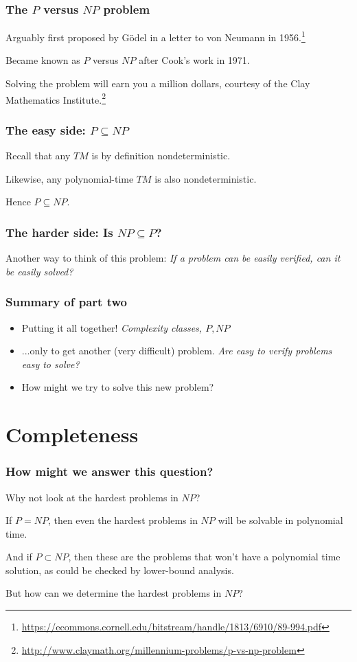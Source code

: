 \documentclass[aspectratio=169]{beamer}
\begin{document}
\begin{frame}
\frametitle{The $P$ versus $NP$ problem}
Arguably first proposed by G\"{o}del in a letter to von Neumann in 1956.\footnote{\url{https://ecommons.cornell.edu/bitstream/handle/1813/6910/89-994.pdf}}

Became known as $P$ versus $NP$ after Cook's work in 1971.

Solving the problem will earn you a million dollars, courtesy of the Clay Mathematics Institute.\footnote{\url{http://www.claymath.org/millennium-problems/p-vs-np-problem}}
\end{frame}

\begin{frame}
\frametitle{The easy side: $P \subseteq NP$}

Recall that any $TM$ is by definition nondeterministic.

Likewise, any polynomial-time $TM$ is also nondeterministic.

Hence $P \subseteq NP$.
\end{frame}

\begin{frame}
\frametitle{The harder side: Is $NP \subseteq P$?}

Another way to think of this problem: {\em If a problem can be easily verified, can it be easily solved?}
\end{frame}

\begin{frame}
\frametitle{Summary of part two}
\begin{itemize}
    \item Putting it all together! {\em Complexity classes, $P, NP$}
    \item ...only to get another (very difficult) problem. {\em Are easy to verify problems easy to solve?}
    \item How might we try to solve this new problem?
\end{itemize}
\end{frame}

\section{Completeness}

\begin{frame}
\frametitle{How might we answer this question?}

Why not look at the hardest problems in $NP$?

If $P = NP$, then even the hardest problems in $NP$ will be solvable in polynomial time.

And if $P \subset NP$, then these are the problems that won't have a polynomial time solution, as could be checked by lower-bound analysis.

But how can we determine the hardest problems in $NP$?
\end{frame}
\end{document}

